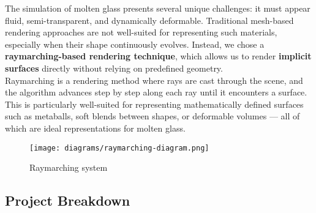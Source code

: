 \documentclass{rapportcs}
\begin{document}
The simulation of molten glass presents several unique challenges: it must appear fluid, semi-transparent, and dynamically deformable. Traditional mesh-based rendering approaches are not well-suited for representing such materials, especially when their shape continuously evolves. Instead, we chose a \textbf{raymarching-based rendering technique}, which allows us to render \textbf{implicit surfaces} directly without relying on predefined geometry.\\

Raymarching is a rendering method where rays are cast through the scene, and the algorithm advances step by step along each ray until it encounters a surface. This is particularly well-suited for representing mathematically defined surfaces such as metaballs, soft blends between shapes, or deformable volumes — all of which are ideal representations for molten glass.

\begin{figure}[H]
    \centering
    \texttt{[image: diagrams/raymarching-diagram.png]}
    \caption{Raymarching system}
    \label{fig:label_image}
\end{figure}
\newpage


\subsection{Project Breakdown}
\end{document}
